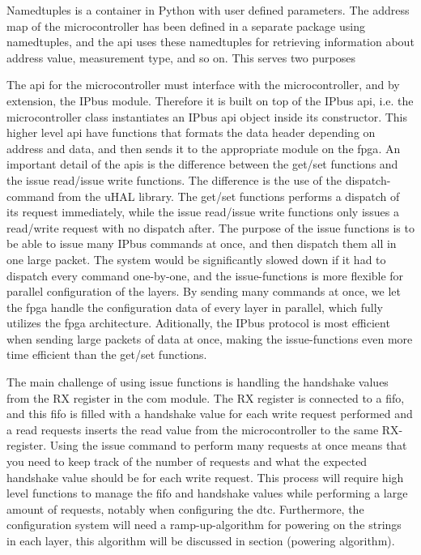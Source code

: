 \documentclass[main.tex]{subfiles}
\begin{document}
Namedtuples is a container in Python with user defined parameters. The address map of the microcontroller has been defined in a separate package using namedtuples, and the \gls{api} uses these namedtuples for retrieving information about address value, measurement type, and so on. This serves two purposes





The \gls{api} for the microcontroller must interface with the microcontroller, and by extension, the IPbus module. Therefore it is built on top of the IPbus \gls{api}, i.e. the microcontroller class instantiates an IPbus \gls{api} object inside its constructor. This higher level \gls{api} have functions that formats the data header depending on address and data, and then sends it to the appropriate module on the \gls{fpga}. An important detail of the \gls{api}s is the difference between the get/set functions and the issue read/issue write functions. The difference is the use of the dispatch-command from the uHAL library. The get/set functions performs a dispatch of its request immediately, while the issue read/issue write functions only issues a read/write request with no dispatch after. The purpose of the issue functions is to be able to issue many IPbus commands at once, and then dispatch them all in one large packet. The system would be significantly slowed down if it had to dispatch every command one-by-one, and the issue-functions is more flexible for parallel configuration of the layers. By sending many commands at once, we let the \gls{fpga} handle the configuration data of every layer in parallel, which fully utilizes the \gls{fpga} architecture. Aditionally, the IPbus protocol is most efficient when sending large packets of data at once, making the issue-functions even more time efficient than the get/set functions.

The main challenge of using issue functions is handling the handshake values from the RX register in the com module. The RX register is connected to a \gls{fifo}, and this \gls{fifo} is filled with a handshake value for each write request performed and a read requests inserts the read value from the microcontroller to the same RX-register. Using the issue command to perform many requests at once means that you need to keep track of the number of requests and what the expected handshake value should be for each write request. This process will require high level functions to manage the \gls{fifo} and handshake values while performing a large amount of requests, notably when configuring the \gls{dtc}. Furthermore, the configuration system will need a ramp-up-algorithm for powering on the strings in each layer, this algorithm will be discussed in section (powering algorithm).
\end{document}
